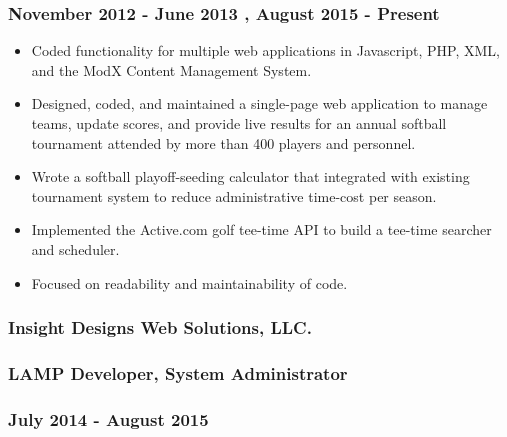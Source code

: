 \hypertarget{november-2012---june-2013-august-2015---present}{%
\subsubsection{November 2012 - June 2013 , August 2015 -
Present}\label{november-2012---june-2013-august-2015---present}}

\begin{itemize}
\tightlist
\item
  Coded functionality for multiple web applications in Javascript, PHP,
  XML, and the ModX Content Management System.
\item
  Designed, coded, and maintained a single-page web application to
  manage teams, update scores, and provide live results for an annual
  softball tournament attended by more than 400 players and personnel.
\item
  Wrote a softball playoff-seeding calculator that integrated with
  existing tournament system to reduce administrative time-cost per
  season.
\item
  Implemented the Active.com golf tee-time API to build a tee-time
  searcher and scheduler.
\item
  Focused on readability and maintainability of code.
\end{itemize}

\hypertarget{insight-designs-web-solutions-llc.}{%
\subsubsection{Insight Designs Web Solutions,
LLC.}\label{insight-designs-web-solutions-llc.}}

\hypertarget{lamp-developer-system-administrator}{%
\subsubsection{LAMP Developer, System
Administrator}\label{lamp-developer-system-administrator}}

\hypertarget{july-2014---august-2015}{%
\subsubsection{July 2014 - August 2015}\label{july-2014---august-2015}}

